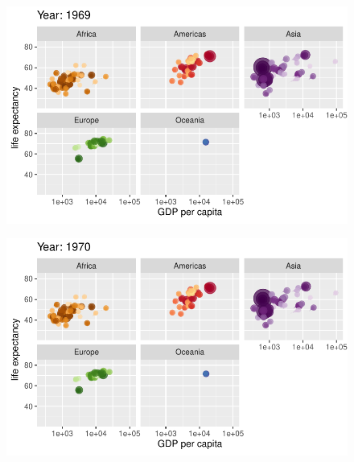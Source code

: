 \documentclass[
  letterpaper,
  DIV=11,
  numbers=noendperiod]{scrartcl}
\begin{document}
\begin{figure}[H]

{\centering \includegraphics{class05_files/figure-pdf/unnamed-chunk-24-32.pdf}

}

\end{figure}

\begin{figure}[H]

{\centering \includegraphics{class05_files/figure-pdf/unnamed-chunk-24-33.pdf}

}

\end{figure}
\end{document}
